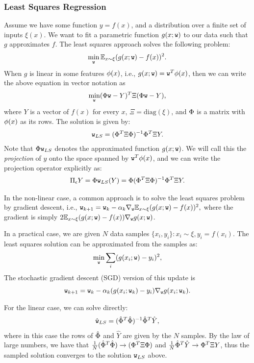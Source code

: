 \subsubsection{Least Squares Regression}
Assume we have some function $y = f(x)$, and a distribution over a finite set of inputs $\xi(x)$. 
We want to fit a parametric function $g(x;\texttt{w})$ to our data such that $g$ approximates $f$. The least squares approach solves the following problem:
$$
\min_{\texttt{w}} \mathbb{E}_{x\sim\xi} (g(x;\texttt{w}) - f(x))^2.
$$
When $g$ is linear in some features $\phi(x)$, i.e., $g(x;\texttt{w}) = \texttt{w}^T \phi(x)$, then we can write the above equation in vector notation as
$$
\min_{\texttt{w}} (\Phi \texttt{w} - Y)^T \Xi (\Phi \texttt{w} - Y),
$$
where $Y$ is a vector of $f(x)$ for every $x$, $\Xi = \text{diag}(\xi)$, and $\Phi$ is a matrix with $\phi(x)$ as its rows. The solution is given by:
$$
\texttt{w}_{LS} = (\Phi^T \Xi \Phi)^{-1} \Phi^T \Xi Y.
$$
Note that $\Phi \texttt{w}_{LS}$ denotes the approximated function $g(x;\texttt{w})$. We will call this the \emph{projection} of $y$ onto the space spanned by $\texttt{w}^T \phi(x)$, and we can write the projection operator explicitly as:
$$
\Pi_\epsilon Y = \Phi \texttt{w}_{LS}(Y) = \Phi (\Phi^T \Xi \Phi)^{-1} \Phi^T \Xi Y.
$$

In the non-linear case, a common approach is to solve the least squares problem by gradient descent, i.e., $\texttt{w}_{k+1} = \texttt{w}_k - \alpha_k \nabla_{\texttt{w}} \mathbb{E}_{x\sim\xi} (g(x;\texttt{w}) - f(x))^2,$ where the gradient is simply $2 \mathbb{E}_{x\sim\xi} (g(x;\texttt{w}) - f(x))\nabla_{\texttt{w}} g(x;\texttt{w})$. 

In a practical case, we are given $N$ data samples $\{ x_i, y_i \}: x_i\sim \xi, y_i=f(x_i)$. The least squares solution can be approximated from the samples as:
$$
\min_{\texttt{w}} \sum_i (g(x_i;\texttt{w}) - y_i)^2,
$$
The stochastic gradient descent (SGD) version of this update is
$$
\texttt{w}_{k+1} = \texttt{w}_k - \alpha_k (g(x_i;\texttt{w}_k) - y_i)\nabla_{\texttt{w}} g(x_i;\texttt{w}_k).
$$

For the linear case, we can solve directly:
$$
\hat{\texttt{w}}_{LS} = (\hat{\Phi}^T \hat{\Phi})^{-1} \hat{\Phi}^T \hat{Y},
$$
where in this case the rows of $\hat{\Phi}$ and $\hat{Y}$ are given by the $N$ samples. By the law of large numbers, we have that $\frac{1}{N}(\hat{\Phi}^T \hat{\Phi}) \to (\Phi^T \Xi \Phi)$ and $\frac{1}{N}\hat{\Phi}^T \hat{Y} \to \Phi^T \Xi Y$, thus the sampled solution converges to the solution $\texttt{w}_{LS}$ above.

